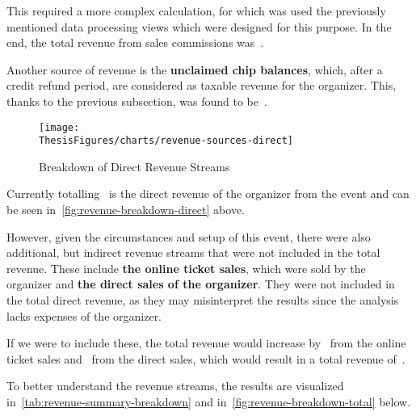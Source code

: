 This required a more complex calculation, for which was used the previously mentioned data processing views which were designed for this purpose.
In the end, the total revenue from sales commissions was~.

Another source of revenue is the \textbf{unclaimed chip balances}, which, after a credit refund period, are considered as taxable revenue for the organizer.
This, thanks to the previous subsection, was found to be~.

\begin{figure}[H]
	\centering
	\texttt{[image: \\ThesisFigures/charts/revenue-sources-direct]}
	\caption{Breakdown of Direct Revenue Streams}
	\label{fig:revenue-breakdown-direct}
\end{figure}

Currently totalling~ is the direct revenue of the organizer from the event and can be seen in~\autoref{fig:revenue-breakdown-direct} above.

However, given the circumstances and setup of this event, there were also additional, but indirect revenue streams that were not included in the total revenue.
These include \textbf{the online ticket sales}, which were sold by the organizer and \textbf{the direct sales of the organizer}.
They were not included in the total direct revenue, as they may misinterpret the results since the analysis lacks expenses of the organizer.

If we were to include these, the total revenue would increase by~ from the online ticket sales and~ from the direct sales, which would result in a total revenue of~.

To better understand the revenue streams, the results are visualized in~\autoref{tab:revenue-summary-breakdown} and in~\autoref{fig:revenue-breakdown-total} below.

